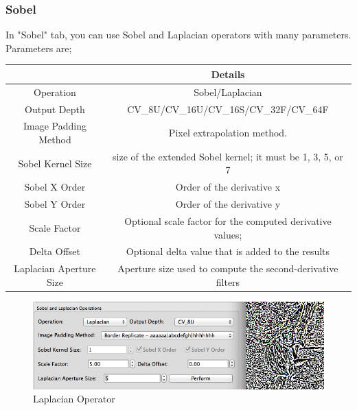 \documentclass{article}
\begin{document}
\subsubsection{Sobel}

In "Sobel" tab, you can use Sobel and Laplacian operators with many parameters.	Parameters are;

\begin{table}[H]
\begin{center}
\begin{tabular}{|c|c|l|l|l|}
\hline
\textbf{}               & \multicolumn{4}{|c|}{\textbf{Details}}                                            \\ \hline
Operation               & \multicolumn{4}{|c|}{Sobel/Laplacian}                                             \\ \hline
Output Depth            & \multicolumn{4}{|c|}{CV\_8U/CV\_16U/CV\_16S/CV\_32F/CV\_64F}                      \\ \hline
Image Padding Method    & \multicolumn{4}{|c|}{Pixel extrapolation method.}                            \\ \hline
Sobel Kernel Size       & \multicolumn{4}{|c|}{size of the extended Sobel kernel; it must be 1, 3, 5, or 7} \\ \hline
Sobel X Order           & \multicolumn{4}{|c|}{Order of the derivative x}                                   \\ \hline
Sobel Y Order           & \multicolumn{4}{|c|}{Order of the derivative y}                                   \\ \hline
Scale Factor            & \multicolumn{4}{|c|}{Optional scale factor for the computed derivative values;}   \\ \hline
Delta Offset            & \multicolumn{4}{|c|}{Optional delta value that is added to the results}           \\ \hline
Laplacian Aperture Size & \multicolumn{4}{|c|}{Aperture size used to compute the second-derivative filters} \\ \hline
\end{tabular}
\end{center}
\end{table}


\begin{figure}[H]
\begin{center}
\includegraphics[scale=0.5]{toolboxSobel.png}
\caption{Laplacian Operator}
\end{center}
\end{figure}	
\end{document}
